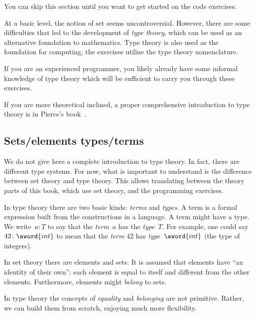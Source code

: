 
\begin{remark}
    You can skip this section until you want to get started on the code exercises.
\end{remark}

At a basic level, the notion of set seems uncontroversial.
However, there are some difficulties that led to the development of \emph{type theory},
which can be used as an alternative foundation to mathematics.
Type theory is also used as the foundation for computing; the exercises utilize the type theory nomenclature.

If you are an experienced programmer, you likely already have some informal knowledge of type theory which will be sufficient to carry you through these exercises.


If you are more theoretical inclined, a proper comprehensive introduction to type theory is in Pierce's book~\cite{pierce02types}.

\subsection{Sets/elements \vs types/terms}
We do not give here a complete introduction to type theory.
In fact, there are different type systems.
For now, what is important to understand is the difference between set theory and type theory.
This allows translating between the theory parts of this book, which use set theory, and the programming exercises.

In type theory there are two basic kinds: \emph{terms} and \emph{types}.
A term is a formal expression built from the constructions in a language.
A term might have a type.
We write~$a \colon T$ to say that the \emph{term}~$a$ has the \emph{type}~$T$.
For example, one could say~$42 \colon \aword{int}$ to mean that the \emph{term}  $42$ has \emph{type}~$\aword{int}$ (the type of integers).

In set theory there are elements and sets.
It is assumed that elements have ``an identity of their own'': each element is equal to itself and different from the other elements.
Furthermore, elements might \emph{belong} to sets.

In type theory the concepts of \emph{equality} and \emph{belonging} are not primitive.
Rather, we can build them from scratch, enjoying much more flexibility.


